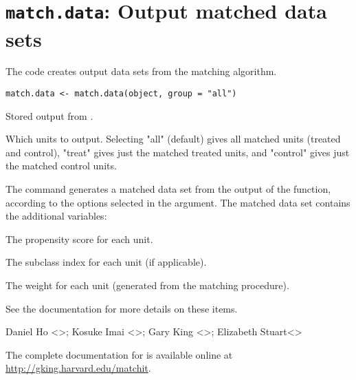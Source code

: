  \section{{\tt match.data}: Output matched data sets}\label{ss:match.data}
\begin{Description}\relax
The code  creates output data sets from the 
matching algorithm.
\end{Description}
\begin{Usage}
\begin{verbatim}
match.data <- match.data(object, group = "all")
\end{verbatim}
\end{Usage}
\begin{Arguments}
\begin{ldescription}
\item[\code{object}] Stored output from .
\item[\code{group}] Which units to output.  Selecting "all" (default) gives all
matched units (treated and control), "treat" gives just the matched
treated units, and "control" gives just the matched control units.
\end{ldescription}
\end{Arguments}
\begin{Value}
The  command generates a matched data set from
the output of the  function, according to the options
selected in the  argument.  The matched data set contains
the additional variables: 
\begin{ldescription}
\item[\code{pscore}] The propensity score for each unit.
\item[\code{psclass}] The subclass index for each unit (if applicable).
\item[\code{psweights}] The weight for each unit (generated from the matching
procedure).
\end{ldescription}

See the  documentation for more details on these items.
\end{Value}
\begin{Author}\relax
Daniel Ho <>; Kosuke Imai
<>; Gary King
<>; Elizabeth Stuart<>
\end{Author}
\begin{SeeAlso}\relax
The complete documentation for  is available online at
\url{http://gking.harvard.edu/matchit}.
\end{SeeAlso}


